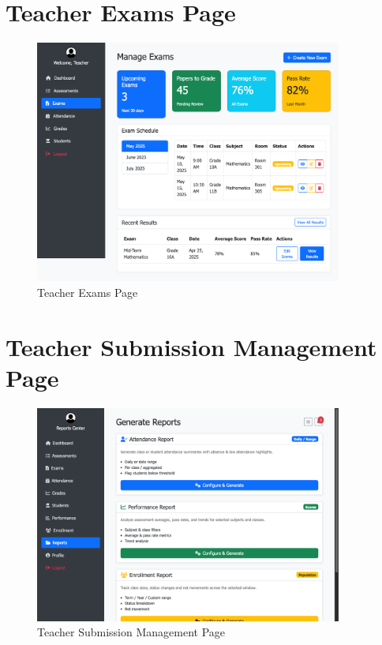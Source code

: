 \documentclass[12pt,a4paper]{report}
\begin{document}
\section{Teacher Exams Page}
\begin{figure}[htbp]
    \centering
    \includegraphics[width=0.9\textwidth]{teacher-exams-page.png}
    \caption{Teacher Exams Page}
    \label{fig:teacher-exams-page}
\end{figure}

\section{Teacher Submission Management Page}
\begin{figure}[htbp]
    \centering
    \includegraphics[width=0.9\textwidth]{teacher-reports-page.png}
    \caption{Teacher Submission Management Page}
    \label{fig:teacher-submission-management-page}
\end{figure}
\end{document}
